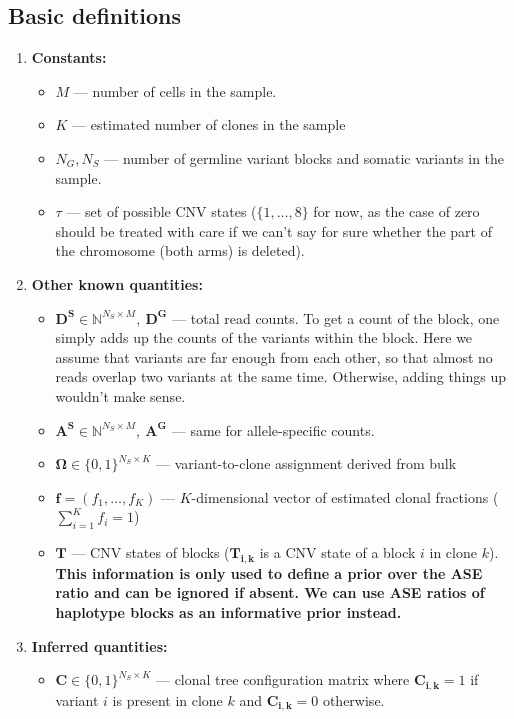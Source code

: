 \documentclass[11pt,a4paper,fullpage]{article}
\def\N{\mathbb{N}}
\theoremstyle{definition}
\theoremstyle{definition}
\theoremstyle{definition}
\numberwithin{equation}{section}
\begin{document}
	\subsection{Basic definitions}
	\begin{enumerate}
		\item \textbf{Constants:}
		\begin{itemize}
			\item $ M $ — number of cells in the sample.
			\item $ K $  — estimated number of clones in the sample 
			\item $ N_{G}, N_{S} $ — number of germline variant blocks and somatic variants in the sample. 
			\item $ \tau $ — set of possible CNV states ($\{1, \ldots, 8 \}$ for now, as the case of zero should be treated with care if we can't say for sure whether the part of the chromosome (both arms) is deleted).
		\end{itemize}
		\item \textbf{Other known quantities:}
		\begin{itemize}
			\item $ \mathbf{D^{S}} \in \N^{N_{S}\times M},\ \mathbf{D^{G}} $ — total read counts. To get a count of the block, one simply adds up the counts of the variants within the block. Here we assume that variants are far enough from each other, so that almost no reads overlap two variants at the same time. Otherwise, adding things up wouldn't make sense.
			\item $ \mathbf{A^{S}} \in \N^{N_{S}\times M},\ \mathbf{A^{G}} $ — same for allele-specific counts.
			\item $ \mathbf{\Omega} \in \{0, 1\}^{N_{S} \times K} $ — variant-to-clone assignment derived from bulk
			\item $ \textbf{f} = (f_1, \ldots, f_K)$ — $K$-dimensional vector of estimated clonal fractions ($ \sum_{i=1}^{K} f_i = 1 $) 
			\item $ \mathbf{T} $ — CNV states of blocks ($\mathbf{T_{i,k}}$ is a CNV state of a block $ i $ in clone $ k $). \textbf{This information is only used to define a prior over the ASE ratio and can be ignored if absent. We can use ASE ratios of haplotype blocks as an informative prior instead.}
		\end{itemize}
		\item \textbf{Inferred quantities:}
		\begin{itemize}
			\item $ \mathbf{C} \in \{0, 1\}^{N_{S} \times K}$ —  clonal tree configuration matrix where $ \mathbf{C_{i,k}} = 1 $ if variant $ i $ is present in clone $ k $ and $ \mathbf{C_{i,k}} = 0 $ otherwise.
			

\end{itemize}
\end{enumerate}
\end{document}
